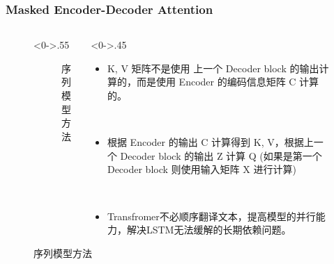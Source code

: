 \documentclass[10pt,t,handout]{beamer}
\begin{document}
\begin{frame}
\frametitle{Masked Encoder-Decoder Attention}
	\begin{figure}
		\begin{columns}[T] %
			\begin{column}<0->{.55\textwidth}
				\begin{figure}[thpb]
					\centering
					\caption{序列模型方法}
					\label{fmps}
				\end{figure}
				 
			\end{column}%
			\hfill%
			\begin{column}<0->{.45\textwidth}
				\begin{itemize}
					\item<1-> K, V 矩阵不是使用 上一个 Decoder block 的输出计算的，而是使用 Encoder 的编码信息矩阵 C 计算的。
					
					\
					
					\item<2->  根据 Encoder 的输出 C 计算得到 K, V，根据上一个 Decoder block 的输出 Z 计算 Q (如果是第一个 Decoder block 则使用输入矩阵 X 进行计算) 
					 
					\
					
					\item<3-> Transfromer不必顺序翻译文本，提高模型的并行能力，解决LSTM无法缓解的长期依赖问题。
					
				\end{itemize}
			\end{column}%
		\end{columns}
	\end{figure}
\end{frame}
\end{document}
